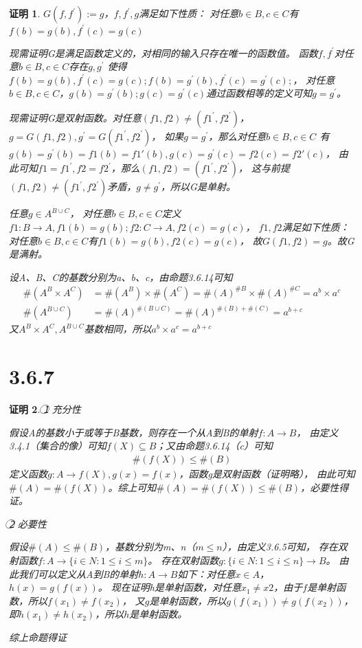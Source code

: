 \documentclass{article}
\theoremstyle{mystyle}
\theoremstyle{zproofstyle}
\newtheorem*{zproof}{证明}
\begin{document}
\begin{zproof}
  $G(f,f^\prime):=g$，$f,f^\prime,g$满足如下性质：
  对任意$b \in B, c \in C$有$f(b)=g(b),f^\prime(c)=g(c)$

  现需证明G是满足函数定义的，对相同的输入只存在唯一的函数值。
  函数$f,f^\prime$对任意$b \in B, c \in C$存在$g, g^\prime$
  使得$f(b)=g(b),f^\prime(c)=g(c); f(b)=g^\prime(b),f^\prime(c)=g^\prime(c);$，
  对任意$b \in B, c \in C$，$g(b)=g^\prime(b);g(c)=g^\prime(c)$通过函数相等的定义可知$g=g^\prime$。

  现需证明G是双射函数。对任意$(f1,f2) \neq (f1^\prime,f2^\prime)$，
  $g=G(f1,f2),g^\prime=G(f1^\prime,f2^\prime)$，
  如果$g = g^\prime$，那么对任意$b \in B, c \in C$
  有$g(b)=g^\prime(b)=f1(b)=f1\prime(b),g(c)=g^\prime(c)=f2(c)=f2\prime(c)$，
  由此可知$f1=f1^\prime,f2=f2^\prime$，那么$(f1,f2) = (f1^\prime,f2^\prime)$，
  这与前提$(f1,f2) \neq (f1^\prime,f2^\prime)$矛盾，$g \neq g^\prime$，所以G是单射。

  任意$g \in A^{B \cup C}$，
  对任意$b \in B, c \in C$定义$f1:B \rightarrow A, f1(b)=g(b); f2: C \rightarrow A, f2(c)=g(c)$，
  $f1,f2$满足如下性质：对任意$b \in B, c \in C$有$f1(b)=g(b),f2(c)=g(c)$，
  故$G(f1,f2)=g$。故G是满射。

  设A、B、C的基数分别为a、b、c，由命题3.6.14可知
  \begin{align}
    \#(A^B \times A^C) & = \#(A^B) \times \#(A^C) = \#(A)^{\#B} \times \#(A)^{\#C} = a^b \times a^c \\
    \#(A^{B \cup C})   & = \#(A)^{\#(B \cup C)} = \#(A)^{\#(B) + \#(C)} = a^{b+c}
  \end{align}
  又$A^B \times A^C,A^{B \cup C}$基数相同，所以$a^b \times a^c = a^{b+c}$
\end{zproof}

\section*{3.6.7}
\begin{zproof}
  \textcircled{1} 充分性

  假设A的基数小于或等于B基数，则存在一个从A到B的单射$f: A \rightarrow B$，
  由定义3.4.1（集合的像）可知$f(X) \subseteq B$；又由命题3.6.14（c）可知
  \begin{align}
    \#(f(X)) \leq \#(B)
  \end{align}
  定义函数$g: A \rightarrow f(X), g(x)=f(x)$，函数g是双射函数（证明略），
  由此可知$\#(A) = \#(f(X))$。综上可知$\#(A) = \#(f(X)) \leq \#(B)$，必要性得证。

  \textcircled{2} 必要性

  假设$\#(A) \leq \#(B)$，基数分别为m、n（$m \leq n$），由定义3.6.5可知，
  存在双射函数$f: A \rightarrow \{i \in N: 1 \leq i \leq m \}$。
  存在双射函数$g: \{i \in N: 1 \leq i \leq n \} \rightarrow B$。
  由此我们可以定义从A到B的单射$h: A \rightarrow B$如下：对任意$x \in A$，$h(x)=g(f(x))$。
  现在证明h是单射函数，对任意$x_1 \neq x2$，由于$f$是单射函数，所以$f(x_1) \neq f(x_2)$，
  又$g$是单射函数，所以$g(f(x_1)) \neq g(f(x_2))$，即$h(x_1) \neq h(x_2)$，所以$h$是单射函数。

  综上命题得证

\end{zproof}
\end{document}

